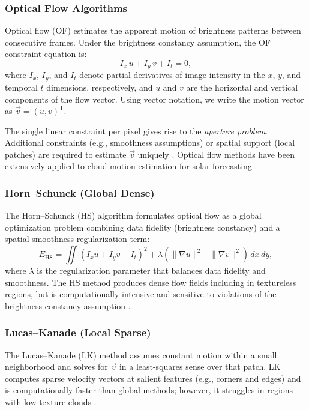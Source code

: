 \subsubsection{Optical Flow Algorithms}
Optical flow (OF) estimates the apparent motion of brightness patterns between consecutive frames. Under the brightness constancy assumption, the OF constraint equation is:
\[
I_x \, u + I_y \, v + I_t = 0,
\]
where $I_x$, $I_y$, and $I_t$ denote partial derivatives of image intensity in the $x$, $y$, and temporal $t$ dimensions, respectively, and $u$ and $v$ are the horizontal and vertical components of the flow vector. Using vector notation, we write the motion vector as $\vec{v}=(u,v)^{\mathsf{T}}$.

The single linear constraint per pixel gives rise to the \emph{aperture problem}. Additional constraints (e.g., smoothness assumptions) or spatial support (local patches) are required to estimate $\vec{v}$ uniquely \cite{horn1981determining}. Optical flow methods have been extensively applied to cloud motion estimation for solar forecasting \cite{urquhart2015,marquez2013}.


\subsubsection*{Horn--Schunck (Global Dense)}
The Horn--Schunck (HS) algorithm formulates optical flow as a global optimization problem combining data fidelity (brightness constancy) and a spatial smoothness regularization term:
\[
E_{\text{HS}} = \iint \left( I_x u + I_y v + I_t \right)^2 + \lambda \left(\|\nabla u\|^2 + \|\nabla v\|^2\right) \, dx \, dy,
\]
where $\lambda$ is the regularization parameter that balances data fidelity and smoothness. The HS method produces dense flow fields including in textureless regions, but is computationally intensive and sensitive to violations of the brightness constancy assumption \cite{horn1981determining}.

\subsubsection*{Lucas--Kanade (Local Sparse)}
The Lucas--Kanade (LK) method assumes constant motion within a small neighborhood and solves for $\vec{v}$ in a least-squares sense over that patch. LK computes sparse velocity vectors at salient features (e.g., corners and edges) and is computationally faster than global methods; however, it struggles in regions with low-texture clouds \cite{lucas1981iterative}.

